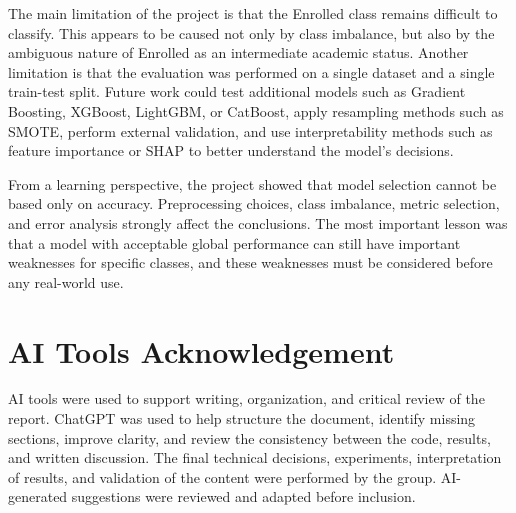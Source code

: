 \documentclass[lettersize,journal]{IEEEtran}
\begin{document}
The main limitation of the project is that the Enrolled class remains difficult to classify. This appears to be caused not only by class imbalance, but also by the ambiguous nature of Enrolled as an intermediate academic status. Another limitation is that the evaluation was performed on a single dataset and a single train-test split. Future work could test additional models such as Gradient Boosting, XGBoost, LightGBM, or CatBoost, apply resampling methods such as SMOTE, perform external validation, and use interpretability methods such as feature importance or SHAP to better understand the model's decisions.

From a learning perspective, the project showed that model selection cannot be based only on accuracy. Preprocessing choices, class imbalance, metric selection, and error analysis strongly affect the conclusions. The most important lesson was that a model with acceptable global performance can still have important weaknesses for specific classes, and these weaknesses must be considered before any real-world use.

\section*{AI Tools Acknowledgement}
AI tools were used to support writing, organization, and critical review of the report. ChatGPT was used to help structure the document, identify missing sections, improve clarity, and review the consistency between the code, results, and written discussion. The final technical decisions, experiments, interpretation of results, and validation of the content were performed by the group. AI-generated suggestions were reviewed and adapted before inclusion.
\end{document}
